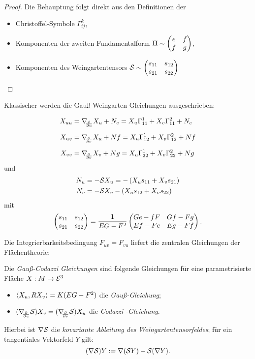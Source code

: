 \begin{proof}
	
	Die Behauptung folgt direkt aus den Definitionen der 
	\begin{itemize}
		
		\item Christoffel-Symbole $ \Gamma_{ij}^k $,
		\item Komponenten der zweiten Fundamentalform $ \mathrm{II} \sim \begin{pmatrix} e & f \\ f & g \end{pmatrix} $,
		\item  Komponenten des Weingartentensors $ \mathcal S  \sim \begin{pmatrix}  s_{11} & s_{12} \\ s_{21} & s_{22} \end{pmatrix}$
		
	\end{itemize}
	
\end{proof}
\begin{remark}
	
	Klassischer werden die Gauß-Weingarten Gleichungen ausgeschrieben:
	
	\begin{align*}
		X_{uu} 
			&= \nabla_{\!\!{\partial\over \partial u}}X_u + N_e 
				= X_u\Gamma_{11}^1 + X_v\Gamma_{11}^2 + N_e\\[2mm]
		X_{uv} 
			&=  \nabla_{\!\!{\partial\over \partial v}} X_u + Nf 
				= X_u \Gamma_{12}^1 + X_v \Gamma_{12}^2 + Nf\\[2mm]
		X_{vv}
			&= \nabla_{\!\!{\partial\over \partial v}} X_v + Ng 
				= X_u \Gamma_{22}^1 + X_v \Gamma_{22}^2 + Ng
	\end{align*}
	und 
	\begin{align*}
		N_u 
			&= -\mathcal S X_u 
				= -\left( X_u s_{11} + X_v s_{21} \right)\\
		N_v
			&= -\mathcal S X_v
				-\left( X_u s_{12} + X_v s_{22} \right)
	\end{align*}
	mit
		\[ \begin{pmatrix} s_{11} & s_{12}\\ s_{21} & s_{22} \end{pmatrix}
			= \frac 1{EG-F^2}\begin{pmatrix} Ge-fF & Gf-Fg\\
									Ef-Fe & Eg-Ff \end{pmatrix}. \]
		
\end{remark}
	
	Die Integrierbarkeitsbedingung $ F_{uv}= F_{vu} $ liefert die zentralen Gleichungen der Flächentheorie:

\begin{definition}
	
	Die \emph{Gauß-Codazzi Gleichungen} sind folgende Gleichungen für eine parametrisierte Fläche $ X: M \rightarrow \mathcal E^3 $
	
	\begin{itemize}
		
		\item $\left \langle X_u,RX_v \right\rangle=K(EG-F^2)$ die \emph{Gauß-Gleichung};
		\item $ (\nabla_{\!\!{\partial\over \partial u}} \mathcal S)X_v = (\nabla_{\!\!{\partial\over \partial v}} \mathcal S)X_u $ die \emph{Codazzi -Gleichung}.
		
	\end{itemize}
	Hierbei ist $ \nabla \mathcal S $ die \emph{kovariante Ableitung des Weingartentensorfeldes};
	für ein tangentiales Vektorfeld $ Y $ gilt:
		\[ (\nabla \mathcal S)Y := \nabla(\mathcal S Y) -\mathcal S(\nabla Y). \]
	
\end{definition}



